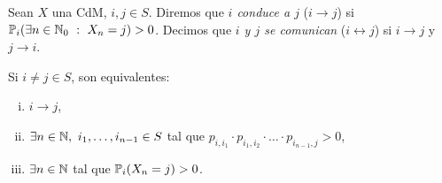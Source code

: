 \begin{definition}
	Sean $X$ una CdM, $i,j \in S$. Diremos que \textit{$i$ conduce a $j$} ($i \to j$) si $\mbb{P}_{i}(\exists n \in \N_{0} \ : \ X_{n} = j) > 0$. Decimos que \textit{$i$ y $j$ se comunican} ($i \leftrightarrow j$) si $i \to j$ y $j \to i$.
\end{definition}

\begin{prop}
	Si $i \neq j \in S$, son equivalentes:
	\begin{enumerate}[i)]
		\item $i \to j$,

		\item $\exists n \in \mathbb{N},\ i_{1},\dots,i_{n-1} \in S$ tal que $p_{i, i_{1}} \cdot p_{i_{1},i_{2}} \cdot \dots \cdot p_{i_{n-1},j} > 0$,

		\item $\exists n \in \mathbb{N}$ tal que $\mathbb{P}_{i}(X_{n} = j) > 0$.
	\end{enumerate}
\end{prop}
